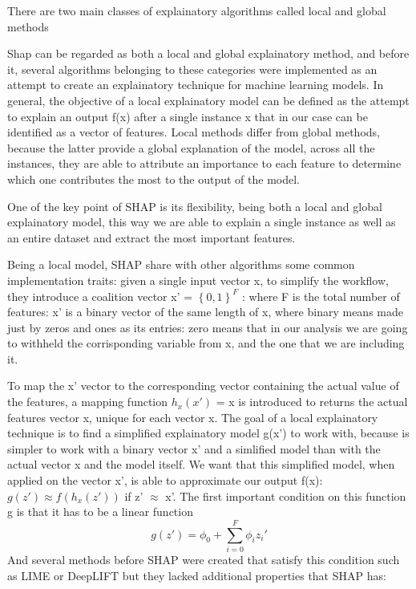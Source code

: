 \documentclass[10pt]{report}
\begin{document}
There are two main classes of explainatory algorithms called local and global methods

Shap can be regarded as both a local and global explainatory method, and before it, several algorithms belonging to these categories were implemented as an attempt to create an explainatory technique for machine learning models.
In general, the objective of a local explainatory model can be defined as the attempt to explain an output f(x) after a single instance x that in our case can be identified as a vector of features.
Local methods differ from global methods, because the latter provide a global explanation of the model, across all the instances, they are able to attribute an importance to each feature to determine which one contributes the most to the output of the model.

One of the key point of SHAP is its flexibility, being both a local and global explainatory model, this way we are able to explain a single instance as well as an entire dataset and extract the most important features.

Being a local model, SHAP share with other algorithms some common implementation traits: given a single input vector x, to simplify the workflow, they introduce a coalition vector x' = $\left\{ 0, 1 \right\}^F$ : where F is the total number of features: x' is a binary vector of the same length of x, where binary means made just by zeros and ones as its entries: zero means that in our analysis we are going to withheld the corrisponding variable from x, and the one that we are including it.

To map the x' vector to the corresponding vector containing the actual value of the features, a mapping function $h_x(x')$ = x is introduced to returns the actual features vector x, unique for each vector x.
The goal of a local explainatory technique is to find a simplified explainatory model g(x') to work with, because is simpler to work with a binary vector x' and a simlified model than with the actual vector x and the model itself.
We want that this simplified model, when applied on the vector x', is able to approximate our output f(x): $ g(z') \approx f(h_x(z'))$ if z' $\approx$ x'.
The first important condition on this function g is that it has to be a linear function
\begin{equation}
\label{eq:shap_g}
g(z') = \phi_0 + \sum_{i = 0}^F \phi_i z_i'
\end{equation}
And several methods before SHAP were created that satisfy this condition such as LIME \cite{ribeiro-2016} or DeepLIFT \cite{shrikumar-2017} but they lacked additional properties that SHAP has:
\end{document}
